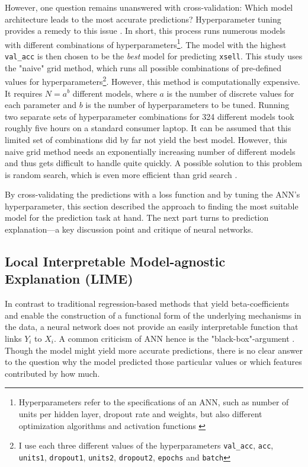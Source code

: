 \documentclass[12pt,a4paper]{article}
\let\code=\texttt
\begin{document}
However, one question remains unanswered with cross-validation: Which model architecture leads to the most accurate predictions?
Hyperparameter tuning provides a remedy to this issue \citep{bergstraRandomSearchHyperparameter2012}.
In short, this process runs numerous models with different combinations of hyperparameters\footnote{Hyperparameters refer to the specifications of an ANN,
such as number of units per hidden layer, dropout rate and weights, but also different optimization algorithms and activation functions \citep{bengioGradientbasedOptimizationHyperparameters2000}}. 
The model with the highest \code{val\_acc} is then chosen to be the \textit{best} model for predicting \code{xsell}.
This study uses the "naive" grid method, which runs all possible combinations of pre-defined values for hyperparameters\footnote{I use each three different values of the hyperparameters \code{val\_acc}, \code{acc}, \code{units1}, \code{dropout1}, \code{units2}, \code{dropout2}, \code{epochs} and \code{batch}}.
However, this method is computationally expensive.
It requires $N=a^b$ different models, where $a$ is the number of discrete values for each parameter and $b$ is the 
number of hyperparameters to be tuned.
Running two separate sets of hyperparameter combinations for 324 different models took roughly five hours on a standard consumer laptop.
It can be assumed that this limited set of combinations did by far not yield the best model.
However, this naive grid method needs an exponentially increasing number of different models and thus gets difficult to handle quite quickly.
A possible solution to this problem is random search, which is even more efficient than grid search \citep{bergstraRandomSearchHyperparameter2012}.

By cross-validating the predictions with a loss function and by tuning the ANN's hyperparameter, 
this section described the approach to finding the most suitable model for the prediction task at hand.
The next part turns to prediction explanation---a key discussion point and critique of neural networks.

\subsection{Local Interpretable Model-agnostic Explanation (LIME)} \label{sec_lime_theory}
In contrast to traditional regression-based methods that yield beta-coefficients and enable the construction of a functional form of 
the underlying mechanisms in the data, a neural network does not provide an easily interpretable function that links $Y_i$ to $X_i$.
A common criticism of ANN hence is the "black-box"-argument \citep{benitezAreArtificialNeural1997, dayhoffArtificialNeuralNetworks2001}.
Though the model might yield more accurate predictions, there is no clear answer to the question why the model predicted those particular values
or which features contributed by how much.
\end{document}
